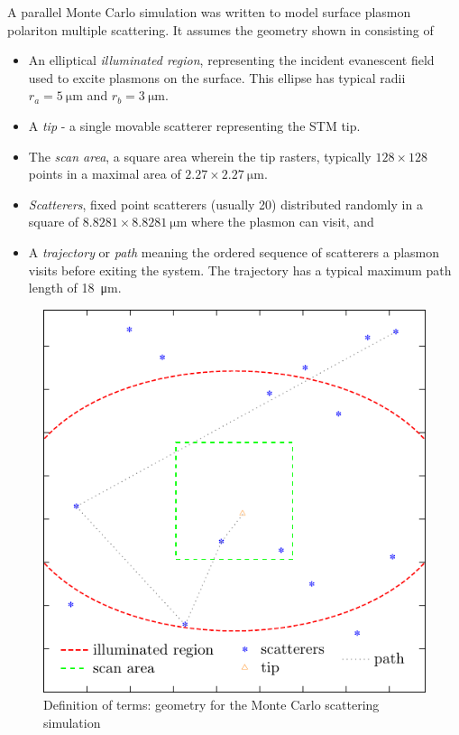 A parallel Monte Carlo simulation was written to model surface plasmon
polariton multiple scattering.
It assumes the geometry shown in  consisting of
\begin{itemize}
\item An elliptical {\it illuminated region}, representing the incident evanescent
field used to excite plasmons on the surface.  This ellipse has 
typical radii $r_a=\SI{5}{\micro\meter}$ and $r_b=\SI{3}{\micro\meter}$.  
\item A {\it tip} - a single movable scatterer representing the STM tip.
\item The {\it scan area}, a square area wherein the tip rasters, typically
$128\times128$ points in a maximal area of $2.27\times\SI{2.27}{\micro\meter}$.  
\item {\it Scatterers}, fixed point scatterers (usually \num{20})
distributed randomly in a square of $8.8281\times\SI{8.8281}{\micro\meter}$
where the plasmon can visit, and
\item A {\it trajectory} or {\it path} meaning the ordered sequence of scatterers a
plasmon visits before exiting the system.  The trajectory has a typical maximum
path length of \SI{18}{\micro\meter}.
\end{itemize}
\begin{figure}[ht]
\centering
\includegraphics[keepaspectratio]{scatteringmicro/figures/montecarlogeo.pdf}
\caption{Definition of terms: geometry for the Monte Carlo scattering
simulation}
\label{fig:plasmongeo}
\end{figure}

